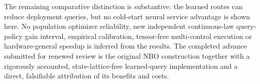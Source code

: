 The remaining comparative distinction is substantive: the learned routes
can reduce deployment queries, but no cold-start neural service
advantage is shown here. No population optimizer reliability, new
independent continuous-law query-policy gain interval, empirical
calibration, tensor-free multi-control execution or hardware-general
speedup is inferred from the results. The completed advance submitted
for renewed review is the original NBO construction together with a
rigorously accounted, state-lattice-free learned-query implementation
and a direct, falsifiable attribution of its benefits and costs.
